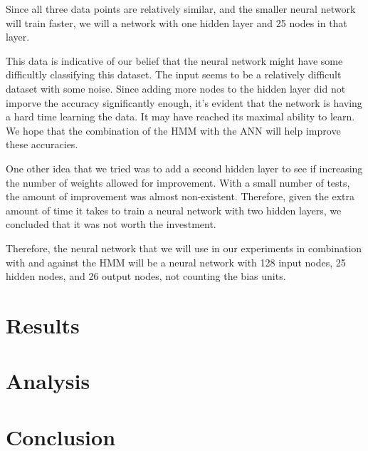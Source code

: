 \documentclass[11pt,a4paper,twocolumn]{article}
\begin{document}
Since all three data points are relatively similar, and the smaller neural network will train faster, we will a network with one hidden layer and 25 nodes in that layer.

This data is indicative of our belief that the neural network might have some difficultly classifying this dataset. The input seems to be a relatively difficult dataset with some noise. Since adding more nodes to the hidden layer did not imporve the accuracy significantly enough, it's evident that the network is having a hard time learning the data. It may have reached its maximal ability to learn. We hope that the combination of the HMM with the ANN will help improve these accuracies.

One other idea that we tried was to add a second hidden layer to see if increasing the number of weights allowed for improvement. With a small number of tests, the amount of improvement was almost non-existent. Therefore, given the extra amount of time it takes to train a neural network with two hidden layers, we concluded that it was not worth the investment.

Therefore, the neural network that we will use in our experiments in combination with and against the HMM will be a neural network with 128 input nodes, 25 hidden nodes, and 26 output nodes, not counting the bias units.


\section{Results}

\section{Analysis}

\section{Conclusion}



\end{document}
